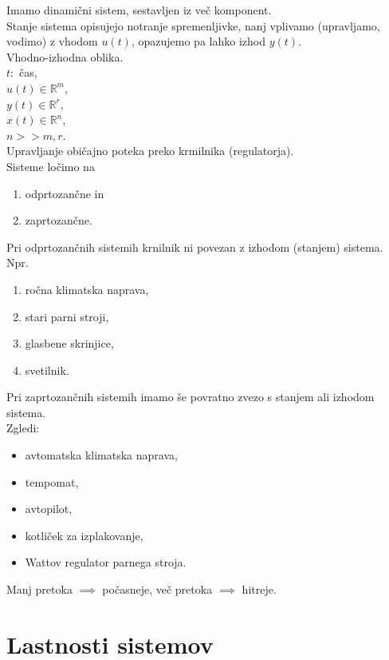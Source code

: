 \documentclass[a4paper, 12pt]{book}
\theoremstyle{definition}
\theoremstyle{remark}
\newcommand{\R}{\mathbb{R}}
\begin{document}
Imamo dinamični sistem, sestavljen iz več komponent. \\
Stanje sistema opisujejo notranje spremenljivke, nanj vplivamo (upravljamo, vodimo) z vhodom $u(t)$,
opazujemo pa lahko izhod $y(t)$. \\
Vhodno-izhodna oblika. \\
$t:$ čas, \\
$u(t) \in \R^m$, \\
$y(t) \in \R^r$, \\
$x(t) \in \R^n$, \\
$n >> m, r$. \\
Upravljanje običajno poteka preko krmilnika (regulatorja). \\
Sisteme ločimo na
\begin{enumerate}[label=\alph*)]
  \item odprtozančne in
  \item zaprtozančne.
\end{enumerate}
Pri odprtozančnih sistemih krnilnik ni povezan z izhodom (stanjem) sistema. \\
Npr.
\begin{enumerate}[label=-]
  \item ročna klimatska naprava,
  \item stari parni stroji,
  \item glasbene skrinjice,
  \item svetilnik.
\end{enumerate}
Pri zaprtozančnih sistemih imamo še povratno zvezo s stanjem ali izhodom sistema. \\
Zgledi:
\begin{itemize}[label=-]
  \item avtomatska klimatska naprava,
  \item tempomat,
  \item avtopilot,
  \item kotliček za izplakovanje,
  \item Wattov regulator parnega stroja.
\end{itemize}
Manj pretoka $\implies$ počasneje, več pretoka $\implies$ hitreje.


\section{Lastnosti sistemov}
\end{document}
